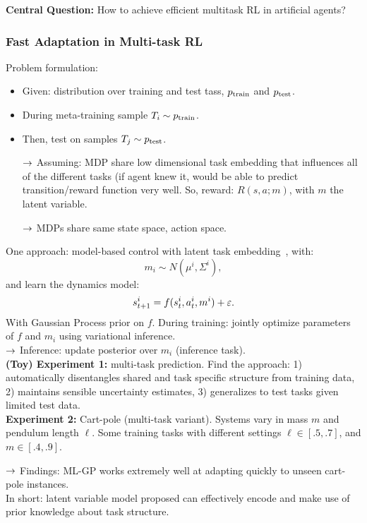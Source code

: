 {\bf Central Question:} How to achieve efficient multitask RL in artificial agents?

\subsubsection{Fast Adaptation in Multi-task RL}

Problem formulation:
\begin{itemize}
    \item Given: distribution over training and test tass, $p_{\text{train}}$ and $p_{\text{test}}$.
    \item During meta-training sample $T_i \sim p_{\text{train}}$.
    \item Then, test on samples $T_j \sim p_{\text{test}}$.
    
    $\rightarrow$ Assuming: MDP share low dimensional task embedding that influences all of the different tasks (if agent knew it, would be able to predict transition/reward function very well. So, reward: $R(s,a;m)$, with $m$ the latent variable.
    
    $\rightarrow$ MDPs share same state space, action space.
\end{itemize}

One approach: model-based control with latent task embedding~\cite{saemundsson2018meta}, with:
\[
m_i \sim N(\mu^i, \Sigma^i),
\]
and learn the dynamics model:
\[
s_{t+1}^i = f(s_t^i, a_t^i, m^i) + \varepsilon.
\]
With Gaussian Process prior on $f$. During training: jointly optimize parameters of $f$ and $m_i$ using variational inference. \\

$\rightarrow$ Inference: update posterior over $m_i$ (inference task). \\

{\bf (Toy) Experiment 1:} multi-task prediction. Find the approach: 1) automatically disentangles shared and task specific structure from training data, 2) maintains sensible uncertainty estimates, 3) generalizes to test tasks given limited test data. \\

{\bf Experiment 2:} Cart-pole (multi-task variant). Systems vary in mass $m$ and pendulum length $\ell$. Some training tasks with different settings $\ell \in [.5, .7]$, and $m \in [.4,.9]$. 

$\rightarrow$ Findings: ML-GP works extremely well at adapting quickly to unseen cart-pole instances. \\

In short: latent variable model proposed can effectively encode and make use of prior knowledge about task structure. \\

